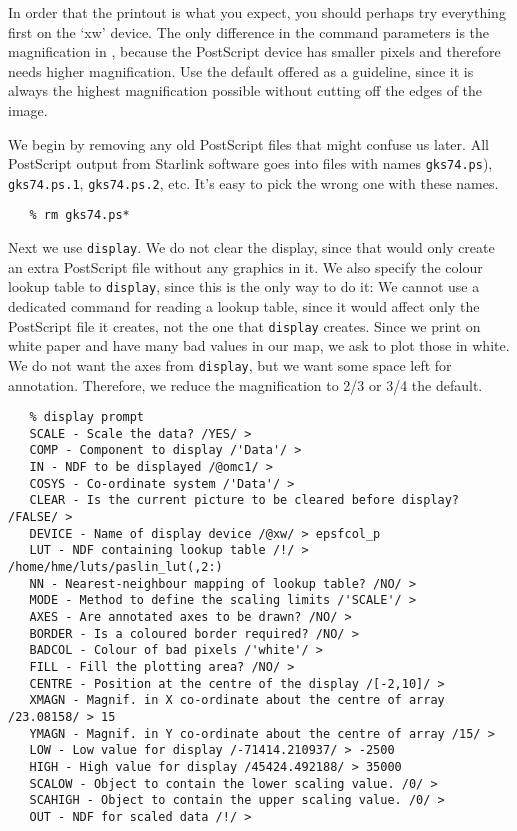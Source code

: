    In order that the printout is what you expect, you should perhaps try
   everything first on the `xw' device. The only difference in the
   command parameters is the magnification in
{\tt {}},
   because
   the PostScript device has smaller pixels and therefore needs higher
   magnification. Use the default offered as a guideline, since it is
   always the highest magnification possible without cutting off the
   edges of the image.

   We begin by removing any old PostScript files that might confuse us
   later. All PostScript output from Starlink software goes into files
   with names {\tt gks74.ps}), {\tt gks74.ps.1}, {\tt gks74.ps.2},
   etc. It's easy to pick the wrong one with these names.

\begin{verbatim}
   % rm gks74.ps*
\end{verbatim}

   Next we use {\tt display}. We do not clear the display, since that
   would only create an extra PostScript file without any graphics in
   it. We also specify the colour lookup table to {\tt display},
   since this is the only way to do it: We cannot use a dedicated
   command for reading a lookup table, since it would affect only the
   PostScript file it creates,
   not the one that {\tt display} creates. Since we print on white
   paper and have many bad values in our map, we ask to plot those in
   white. We do not want the axes from {\tt display}, but we want
   some space left for annotation. Therefore, we reduce the
   magnification to 2/3 or 3/4 the default.

\begin{verbatim}
   % display prompt
   SCALE - Scale the data? /YES/ > 
   COMP - Component to display /'Data'/ > 
   IN - NDF to be displayed /@omc1/ > 
   COSYS - Co-ordinate system /'Data'/ > 
   CLEAR - Is the current picture to be cleared before display? /FALSE/ > 
   DEVICE - Name of display device /@xw/ > epsfcol_p
   LUT - NDF containing lookup table /!/ > /home/hme/luts/paslin_lut(,2:)
   NN - Nearest-neighbour mapping of lookup table? /NO/ > 
   MODE - Method to define the scaling limits /'SCALE'/ > 
   AXES - Are annotated axes to be drawn? /NO/ > 
   BORDER - Is a coloured border required? /NO/ > 
   BADCOL - Colour of bad pixels /'white'/ > 
   FILL - Fill the plotting area? /NO/ > 
   CENTRE - Position at the centre of the display /[-2,10]/ > 
   XMAGN - Magnif. in X co-ordinate about the centre of array /23.08158/ > 15
   YMAGN - Magnif. in Y co-ordinate about the centre of array /15/ > 
   LOW - Low value for display /-71414.210937/ > -2500
   HIGH - High value for display /45424.492188/ > 35000
   SCALOW - Object to contain the lower scaling value. /0/ > 
   SCAHIGH - Object to contain the upper scaling value. /0/ > 
   OUT - NDF for scaled data /!/ > 
\end{verbatim}


